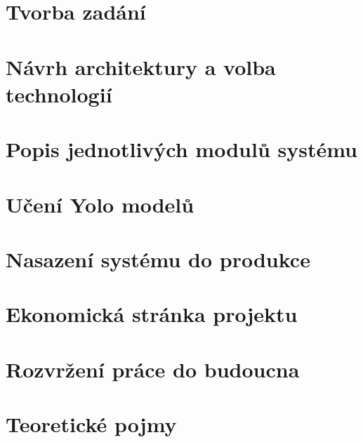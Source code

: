 \newpage
\chapter{Tvorba zadání}\label{ch:tvorba-zadani}


\newpage
\chapter{Návrh architektury a volba technologií}\label{ch:navrh-architektury-a-volba-technologii}


\newpage
\chapter{Popis jednotlivých modulů systému}\label{ch:popis-jednotlivych-modulu}














\newpage
\chapter{Učení Yolo modelů}\label{ch:uceni_yolo_modelu}

\newpage


\newpage
\chapter{Nasazení systému do produkce}\label{ch:nasazeni-systemu-do-produkce}


\newpage
\chapter{Ekonomická stránka projektu}\label{ch:ekonomicka-stranka-projektu}


\newpage
\chapter{Rozvržení práce do budoucna}\label{ch:rozvrzeni-prace-do-budoucna}


\newpage
\chapter{Teoretické pojmy}\label{ch:teoreticke-pojmy}







